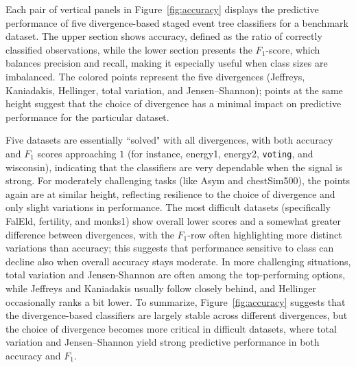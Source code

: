 \documentclass[preprint,12pt]{elsarticle}
\begin{document}
Each pair of vertical panels in Figure~\ref{fig:accuracy} displays the predictive performance of five divergence-based staged event tree classifiers for a benchmark dataset. 
The upper section shows accuracy, defined as the ratio of correctly classified observations, while the lower section presents the $F_{1}$-score, which balances precision and recall, making it especially useful when class sizes are imbalanced. 
The colored points represent the five divergences (Jeffreys, Kaniadakis, Hellinger, total variation, and Jensen--Shannon);
points at the same height suggest that the choice of divergence has a minimal impact on predictive performance for the particular dataset. 

Five datasets are essentially ``solved" with all divergences, with both accuracy and $F_{1}$ scores approaching $1$ (for instance, energy1, energy2, \texttt{voting}, and wisconsin), indicating that the classifiers are very dependable when the signal is strong. For moderately challenging tasks (like Asym and chestSim500), the points again are at similar height, reflecting resilience to the choice of divergence and only slight variations in performance. The most difficult datasets (specifically FalEld, fertility, and monks1) show overall lower scores and a somewhat greater difference between divergences, with the $F_{1}$-row often highlighting more distinct variations than accuracy; this suggests that performance sensitive to class can decline also when overall accuracy stays moderate. In more challenging situations, total variation and Jensen-Shannon are often among the top-performing options, while Jeffreys and Kaniadakis usually follow closely behind, and Hellinger occasionally ranks a bit lower. To summarize, Figure~\ref{fig:accuracy} suggests that the divergence-based classifiers are largely stable across different divergences, but the choice of divergence becomes more critical in difficult datasets, where total variation and Jensen--Shannon yield strong predictive performance in both accuracy and $F_{1}$.
\end{document}
